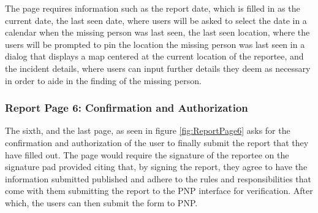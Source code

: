 The page requires information such as the report date, which is filled in as the current date, the last seen date, where users will be asked to select the date in a calendar when the missing person was last seen, the last seen location, where the users will be prompted to pin the location the missing person was last seen in a dialog that displays a map centered at the current location of the reportee, and the incident details, where users can input further details they deem as necessary in order to aide in the finding of the missing person. 

\subsubsection{Report Page 6: Confirmation and Authorization}

The sixth, and the last page, as seen in figure \ref{fig:ReportPage6} asks for the confirmation and authorization of the user to finally submit the report that they have filled out. The page would require the signature of the reportee on the signature pad provided citing that, by signing the report, they agree to have the information submitted published and adhere to the rules and responsibilities that come with them submitting the report to the PNP interface for verification. After which, the users can then submit the form to PNP.

